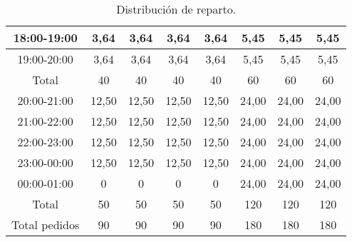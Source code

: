\begin{table}[h]
\begin{tabular}{|c|c|c|c|c|c|c|c|}
\rowcolor[HTML]{9AFF99} 
\cellcolor[HTML]{DAE8FC}18:00-19:00 & 3,64  & 3,64   & 3,64      & 3,64   & \cellcolor[HTML]{34CDF9}5,45  & \cellcolor[HTML]{34CDF9}5,45  & \cellcolor[HTML]{34CDF9}5,45  \\ \hline
\rowcolor[HTML]{9AFF99} 
\cellcolor[HTML]{DAE8FC}19:00-20:00 & 3,64  & 3,64   & 3,64      & 3,64   & \cellcolor[HTML]{34CDF9}5,45  & \cellcolor[HTML]{34CDF9}5,45  & \cellcolor[HTML]{34CDF9}5,45  \\ \hline
\rowcolor[HTML]{FFCC67} 
Total                               & 40    & 40     & 40        & 40     & 60                            & 60                            & 60                            \\ \hline
\rowcolor[HTML]{34CDF9} 
\cellcolor[HTML]{DAE8FC}20:00-21:00 & 12,50 & 12,50  & 12,50     & 12,50  & \cellcolor[HTML]{FE0000}24,00 & \cellcolor[HTML]{FE0000}24,00 & \cellcolor[HTML]{FE0000}24,00 \\ \hline
\rowcolor[HTML]{34CDF9} 
\cellcolor[HTML]{DAE8FC}21:00-22:00 & 12,50 & 12,50  & 12,50     & 12,50  & \cellcolor[HTML]{FE0000}24,00 & \cellcolor[HTML]{FE0000}24,00 & \cellcolor[HTML]{FE0000}24,00 \\ \hline
\rowcolor[HTML]{34CDF9} 
\cellcolor[HTML]{DAE8FC}22:00-23:00 & 12,50 & 12,50  & 12,50     & 12,50  & \cellcolor[HTML]{FE0000}24,00 & \cellcolor[HTML]{FE0000}24,00 & \cellcolor[HTML]{FE0000}24,00 \\ \hline
\rowcolor[HTML]{34CDF9} 
\cellcolor[HTML]{DAE8FC}23:00-00:00 & 12,50 & 12,50  & 12,50     & 12,50  & \cellcolor[HTML]{FE0000}24,00 & \cellcolor[HTML]{FE0000}24,00 & \cellcolor[HTML]{FE0000}24,00 \\ \hline
\rowcolor[HTML]{34CDF9} 
\cellcolor[HTML]{DAE8FC}00:00-01:00 & 0     & 0      & 0         & 0      & \cellcolor[HTML]{FE0000}24,00 & \cellcolor[HTML]{FE0000}24,00 & \cellcolor[HTML]{FE0000}24,00 \\ \hline
\rowcolor[HTML]{FFCC67} 
Total                               & 50    & 50     & 50        & 50     & 120                           & 120                           & 120                           \\ \hline
\rowcolor[HTML]{FFCC67} 
Total pedidos                       & 90    & 90     & 90        & 90     & 180                           & 180                           & 180                           \\ \hline
\end{tabular}
\caption{Distribución de reparto.\label{tab:distribucion de reparto}}
\end{table}